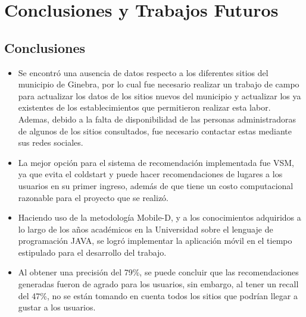 \documentclass[12pt,letterpaper,openany]{book}
\begin{document}
\chapter{Conclusiones y Trabajos Futuros}\label{cap.conclu_trabajos}
\section{Conclusiones}
\begin{itemize}
    \item Se encontró una ausencia de datos respecto a los diferentes sitios del municipio de
Ginebra, por lo cual fue necesario realizar un trabajo de campo para actualizar los
datos de los sitios nuevos del municipio y actualizar los ya existentes de los establecimientos que permitieron realizar esta labor.\\
Ademas, debido a la falta de disponibilidad de las personas administradoras de algunos de los sitios consultados, fue necesario contactar estas mediante sus redes sociales.
\item La mejor opción para el sistema de recomendación implementada fue VSM, ya que evita el coldstart y puede hacer recomendaciones de lugares a los usuarios en su primer ingreso, además de que tiene un costo computacional razonable para el proyecto que se realizó.
\item Haciendo uso de la metodología Mobile-D, y a los conocimientos adquiridos a lo largo de los años académicos en la Universidad sobre el lenguaje de programación JAVA, se logró implementar la aplicación móvil en el tiempo estipulado para el desarrollo del trabajo.
   \item Al obtener una precisión del 79\%, se puede concluir que las recomendaciones generadas fueron de agrado para los usuarios, sin embargo, al tener un recall del 47\%, no se están tomando en cuenta todos los sitios que podrían llegar a gustar a los usuarios.
\end{itemize}
\end{document}

